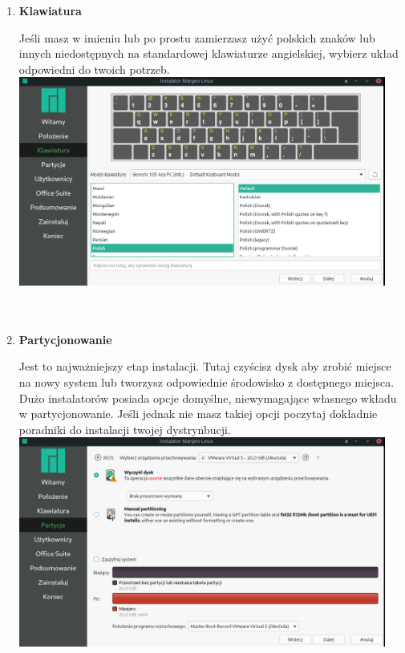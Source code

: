 \documentclass[10pt,a4paper]{report}
\begin{document}
\begin{enumerate}
\item \textbf{Klawiatura} \par
Jeśli masz w imieniu lub po prostu zamierzasz użyć polskich znaków lub innych niedostępnych na standardowej klawiaturze angielskiej, wybierz układ odpowiedni do twoich potrzeb.\\

\includegraphics[width=0.95\textwidth, center]{manjaro_install5.png}\\\\\\

\item \textbf{Partycjonowanie} \par
Jest to najważniejszy etap instalacji. Tutaj czyścisz dysk aby zrobić miejsce na nowy system lub tworzysz odpowiednie środowisko z dostępnego miejsca. Dużo instalatorów posiada opcje domyślne, niewymagające własnego wkładu w partycjonowanie. Jeśli jednak nie masz takiej opcji poczytaj dokładnie poradniki do instalacji twojej dystrynbucji.\\

\includegraphics[width=0.95\textwidth, center]{manjaro_install6.png}\\\\\\




\end{enumerate}
\end{document}

